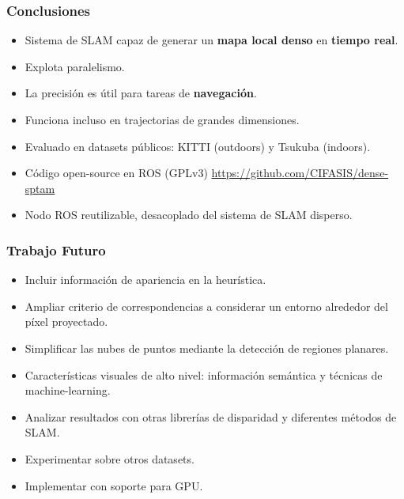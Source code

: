\documentclass[compress]{beamer}
\begin{document}
\begin{frame}
	\frametitle{Conclusiones}
	\begin{itemize}
		\item Sistema de SLAM capaz de generar un \textbf{mapa local denso} en \textbf{tiempo real}.
	    \item Explota paralelismo.
        \item La precisión es útil para tareas de \textbf{navegación}.
        \item Funciona incluso en trajectorias de grandes dimensiones.
        \item Evaluado en datasets públicos: KITTI (outdoors) y Tsukuba (indoors).
	    \item Código open-source en ROS (GPLv3) \url{https://github.com/CIFASIS/dense-sptam}
	    \item Nodo ROS reutilizable, desacoplado del sistema de SLAM disperso.
	\end{itemize}
\end{frame}


\begin{frame}
	\frametitle{Trabajo Futuro}
	\begin{itemize}
		\item Incluir información de apariencia en la heurística.
		\item Ampliar criterio de correspondencias a considerar un entorno alrededor del píxel proyectado.
		\item Simplificar las nubes de puntos mediante la detección de regiones planares.
		\item Características visuales de alto nivel: información semántica y técnicas de machine-learning.
		\item Analizar resultados con otras librerías de disparidad y diferentes métodos de SLAM.
		\item Experimentar sobre otros datasets.
		\item Implementar con soporte para GPU.
	\end{itemize}
\end{frame}


\section*{}


\end{document}
